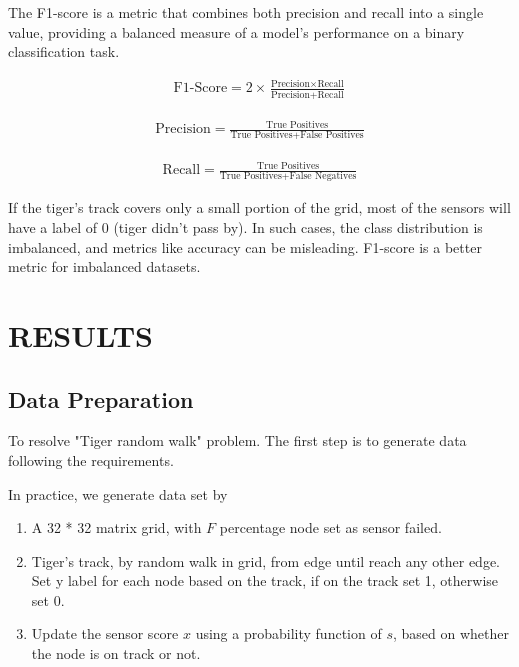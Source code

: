 \documentclass{article}
\begin{document}
The F1-score is a metric that combines both precision and recall into a single value, providing a balanced measure of a model's performance on a binary classification task.

\begin{align}
  \text{F1-Score} = 2 \times \frac{\text{Precision} \times \text{Recall}}{\text{Precision} + \text{Recall}}
\end{align}

\begin{align}
  \text{Precision} = \frac{\text{True Positives}}{\text{True Positives} + \text{False Positives}}
\end{align}

\begin{align}
  \text{Recall} = \frac{\text{True Positives}}{\text{True Positives} + \text{False Negatives}}
\end{align}

If the tiger's track covers only a small portion of the grid, most of the sensors will have a label of 0 (tiger didn't pass by). In such cases, the class distribution is imbalanced, and metrics like accuracy can be misleading. F1-score is a better metric for imbalanced datasets.

\section{RESULTS}
\label{sec:results}

\subsection{Data Preparation}
\label{ssec:data}
To resolve "Tiger random walk" problem. 
The first step is to generate data following the requirements.

In practice, we generate data set by

\begin{enumerate}
  \item A 32 * 32 matrix grid, with $F$ percentage node set as sensor failed.
  \item Tiger's track, by random walk in grid, from edge until reach any other edge.
        \\ Set y label for each node based on the track, if on the track set 1, otherwise set 0.
  \item Update the sensor score $x$ using a probability function of $s$, based on whether the node is on track or not.
\end{enumerate}
\end{document}
